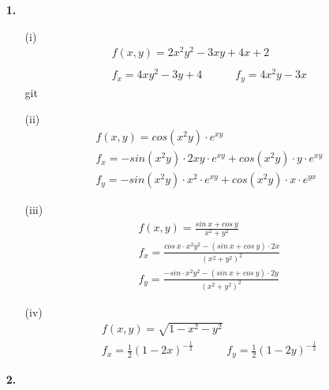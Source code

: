 \documentclass[a4paper,11pt]{article}
\title{\titleinfo}
\author{\authorinfotitle}
\date{\today}
\begin{document}
\maketitle
    \begin{enumerate}
        \item[\textbf{1.}]
        \begin{enumerate}
        	\item[(i)]
        	\begin{align*}
        &f(x,y) = 2x^2y^2-3xy+4x+2 \\ \\
        &f_x = 4xy^2 -3y + 4 \qquad \quad
        f_y = 4x^2y - 3x 
        	\end{align*}git 

        	\item[(ii)]
        	\begin{align*}
        &f(x,y) = cos(x^2y) \cdot e^{xy} \\[0.4cm]
        &f_x = -sin(x^2 y) \cdot 2xy \cdot e^{xy} + cos(x^2y) \cdot y \cdot e^{xy} \\[0.2cm]
        &f_y = -sin(x^2 y) \cdot x^2 \cdot e^{xy} + cos(x^2y) \cdot x \cdot e^{yx}	    
        	\end{align*}
       
        	\item[(iii)]
        	\begin{align*}
        &f(x,y) = \frac{sin \ x + cos \ y}{x^2 +y^2} \\[0.4cm]
        &f_x = \frac{cos \ x \cdot x^2y^2 - (sin \ x + cos \ y) \cdot 2x}{(x^2+y^2)^2} \\
        &f_y = \frac{-sin \cdot x^2y^2 - (sin \ x + cos \ y) \cdot 2y}{(x^2+y^2)^2} 
        	\end{align*}

        	\item[(iv)]
        	\begin{align*}
        &f(x,y) = \sqrt{1-x^2-y^2} \\[0.4cm]
       	&f_x = \frac{1}{2}(1-2x)^{-\frac{1}{2}} \qquad \quad
       	f_y = \frac{1}{2}(1-2y)^{-\frac{1}{2}} 
        	\end{align*}
       

        \end{enumerate}

        \item[\textbf{2.}]
   

\end{enumerate}
\end{document}

